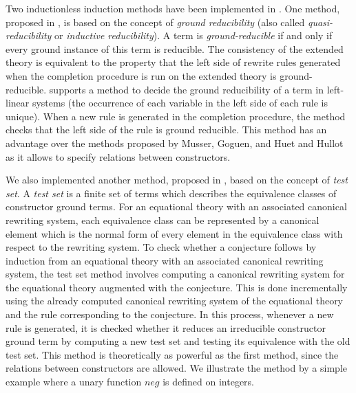 Two inductionless induction methods have been implemented in \ERRL.
One method, proposed in \cite{JK86}, is based on the concept of {\em
ground reducibility} (also called {\em quasi-reducibility} or {\em
inductive reducibility}).  A term is {\em ground-reducible} if and
only if every ground instance of this term is reducible.  The
consistency of the extended theory is equivalent to the property that
the left side of rewrite rules generated when the completion procedure
is run on the extended theory is ground-reducible.  \RRL supports a
method to decide the ground reducibility of a term in left-linear
systems (the occurrence of each variable in the left side of each rule
is unique).  When a new rule is generated in the completion procedure,
the method checks that the left side of the rule is ground reducible.
This method has an advantage over the methods proposed by Musser,
Goguen, and Huet and Hullot as it allows to specify relations between
constructors.

We also implemented 
another method, proposed in \cite{KNZ86}, based on the concept of 
{\em test set}.
A {\em test set} is a finite set of terms which describes the equivalence
classes of constructor ground terms. For an equational theory with an
associated canonical rewriting system, each equivalence class can be
represented by a canonical element which is the normal form of every
element in the equivalence class with respect to the rewriting system.
To check whether a conjecture follows by induction from an equational
theory with an associated canonical rewriting system, the test set
method involves computing a canonical rewriting system for the
equational theory augmented with the conjecture.  This is done
incrementally using the already computed canonical rewriting system of
the equational theory and the rule corresponding to the conjecture. In
this process, whenever a new rule is generated, it is checked whether
it reduces an irreducible constructor ground term by computing a new
test set and testing its equivalence with the old test set. 
This method is theoretically as powerful as the first method,
since the relations between constructors are allowed.
We illustrate the method by a simple example where 
a unary function $neg$ is defined on integers.

